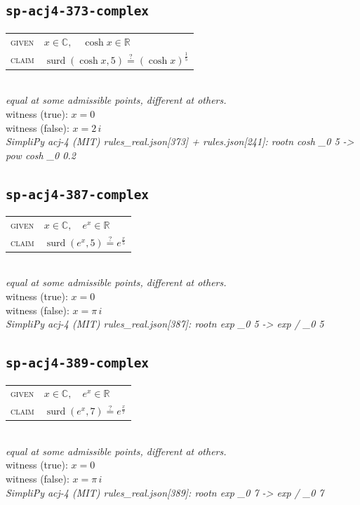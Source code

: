 \documentclass[11pt]{article}
\begin{document}
\subsection*{\texttt{sp-acj4-373-complex}}
\begin{tabular}{@{}l@{\quad}l@{}}
\textsc{given} & $x \in \mathbb{C},\quad \cosh x \in \mathbb{R}$ \\[4pt]
\textsc{claim} & $\displaystyle \operatorname{surd}\left(\cosh x, 5\right) \overset{?}{=} \left(\cosh x\right)^{\frac{1}{5}}$ \\
\end{tabular}\\[2pt]
{\small\emph{equal at some admissible points, different at others.}}\\
{\footnotesize\color{gray}witness (true): $x = 0$}\\
{\footnotesize\color{gray}witness (false): $x = 2 \, i$}\\
\emph{SimpliPy acj-4 (MIT) rules\_real.json[373] + rules.json[241]: rootn cosh \_0 5  ->  pow cosh \_0 0.2}\\

\subsection*{\texttt{sp-acj4-387-complex}}
\begin{tabular}{@{}l@{\quad}l@{}}
\textsc{given} & $x \in \mathbb{C},\quad e^{x} \in \mathbb{R}$ \\[4pt]
\textsc{claim} & $\displaystyle \operatorname{surd}\left(e^{x}, 5\right) \overset{?}{=} e^{\frac{x}{5}}$ \\
\end{tabular}\\[2pt]
{\small\emph{equal at some admissible points, different at others.}}\\
{\footnotesize\color{gray}witness (true): $x = 0$}\\
{\footnotesize\color{gray}witness (false): $x = \pi \, i$}\\
\emph{SimpliPy acj-4 (MIT) rules\_real.json[387]: rootn exp \_0 5  ->  exp / \_0 5}\\

\subsection*{\texttt{sp-acj4-389-complex}}
\begin{tabular}{@{}l@{\quad}l@{}}
\textsc{given} & $x \in \mathbb{C},\quad e^{x} \in \mathbb{R}$ \\[4pt]
\textsc{claim} & $\displaystyle \operatorname{surd}\left(e^{x}, 7\right) \overset{?}{=} e^{\frac{x}{7}}$ \\
\end{tabular}\\[2pt]
{\small\emph{equal at some admissible points, different at others.}}\\
{\footnotesize\color{gray}witness (true): $x = 0$}\\
{\footnotesize\color{gray}witness (false): $x = \pi \, i$}\\
\emph{SimpliPy acj-4 (MIT) rules\_real.json[389]: rootn exp \_0 7  ->  exp / \_0 7}\\
\end{document}
